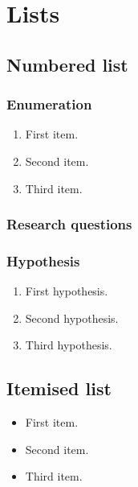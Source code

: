\section{Lists}

\subsection{Numbered list}

\subsubsection{Enumeration}

\begin{enumerate}
    \item First item.
    \item Second item.
    \item Third item.
\end{enumerate}

\subsubsection{Research questions}

\subsubsection{Hypothesis}

\begin{enumerate}[font={\bfseries},label={H\arabic*}.,align=left]
    \item First hypothesis.
    \item Second hypothesis.
    \item Third hypothesis.
\end{enumerate}

\subsection{Itemised list}

\begin{itemize}
    \item First item.
    \item Second item.
    \item Third item.
\end{itemize}

